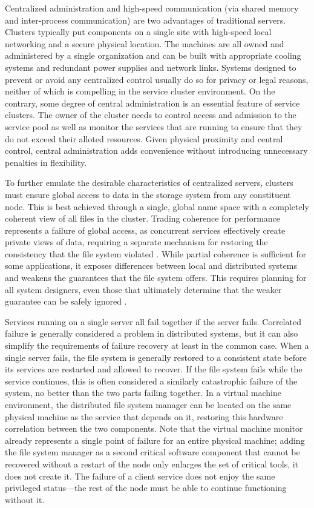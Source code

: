 Centralized administration and high-speed communication (via shared memory and inter-process communication) are two advantages of traditional servers. Clusters typically put components on a single site with high-speed local networking and a secure physical location. The machines are all owned and administered by a single organization and can be built with appropriate cooling systems and redundant power supplies and network links. Systems designed to prevent or avoid any centralized control usually do so for privacy or legal reasons, neither of which is compelling in the service cluster environment. On the contrary, some degree of central administration is an essential feature of service clusters. The owner of the cluster needs to control access and admission to the service pool as well as monitor the services that are running to ensure that they do not exceed their alloted resources. Given physical proximity and central control, central administration adds convenience without introducing unnecessary penalties in flexibility.

To further emulate the desirable characteristics of centralized servers, clusters must ensure global access to data in the storage system from any constituent node. This is best achieved through a single, global name space with a completely coherent view of all files in the cluster. Trading coherence for performance represents a failure of global access, as concurrent services effectively create private views of data, requiring a separate mechanism for restoring the consistency that the file system violated \cite{birrell93}. While partial coherence is sufficient for some applications, it exposes differences between local and distributed systems and weakens the guarantees that the file system offers. This requires planning for all system designers, even those that ultimately determine that the weaker guarantee can be safely ignored \cite{waldo}.


Services running on a single server all fail together if the server fails. Correlated failure is generally considered a problem in distributed systems, but it can also simplify the requirements of failure recovery at least in the common case. When a single server fails, the file system is generally restored to a consistent state before its services are restarted and allowed to recover. If the file system fails while the service continues, this is often considered a similarly catastrophic failure of the system, no better than the two parts failing together. In a virtual machine environment, the distributed file system manager can be located on the same physical machine as the service that depends on it, restoring this hardware correlation between the two components. Note that the virtual machine monitor already represents a single point of failure for an entire physical machine; adding the file system manager as a second critical software component that cannot be recovered without a restart of the node only enlarges the set of critical tools, it does not create it. The failure of a client service does not enjoy the same privileged status---the rest of the node must be able to continue functioning without it.

